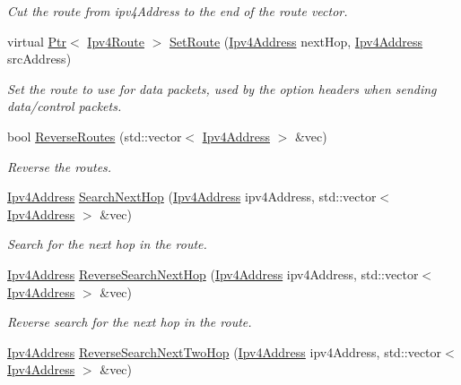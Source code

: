\begin{DoxyCompactItemize}
\begin{DoxyCompactList}\small\item\em Cut the route from ipv4\+Address to the end of the route vector. \end{DoxyCompactList}\item 
virtual \hyperlink{classns3_1_1Ptr}{Ptr}$<$ \hyperlink{classns3_1_1Ipv4Route}{Ipv4\+Route} $>$ \hyperlink{classns3_1_1dsr_1_1DsrOptions_af749b76db4626ae64bc37001a5353b99}{Set\+Route} (\hyperlink{classns3_1_1Ipv4Address}{Ipv4\+Address} next\+Hop, \hyperlink{classns3_1_1Ipv4Address}{Ipv4\+Address} src\+Address)
\begin{DoxyCompactList}\small\item\em Set the route to use for data packets, used by the option headers when sending data/control packets. \end{DoxyCompactList}\item 
bool \hyperlink{classns3_1_1dsr_1_1DsrOptions_a49547f030b51a51499c36f9b5802ec3c}{Reverse\+Routes} (std\+::vector$<$ \hyperlink{classns3_1_1Ipv4Address}{Ipv4\+Address} $>$ \&vec)
\begin{DoxyCompactList}\small\item\em Reverse the routes. \end{DoxyCompactList}\item 
\hyperlink{classns3_1_1Ipv4Address}{Ipv4\+Address} \hyperlink{classns3_1_1dsr_1_1DsrOptions_a061c66ba810a71ae227371a45cc30cc0}{Search\+Next\+Hop} (\hyperlink{classns3_1_1Ipv4Address}{Ipv4\+Address} ipv4\+Address, std\+::vector$<$ \hyperlink{classns3_1_1Ipv4Address}{Ipv4\+Address} $>$ \&vec)
\begin{DoxyCompactList}\small\item\em Search for the next hop in the route. \end{DoxyCompactList}\item 
\hyperlink{classns3_1_1Ipv4Address}{Ipv4\+Address} \hyperlink{classns3_1_1dsr_1_1DsrOptions_a9cc1c0bdf1b57f8b2eea4d9070b26a58}{Reverse\+Search\+Next\+Hop} (\hyperlink{classns3_1_1Ipv4Address}{Ipv4\+Address} ipv4\+Address, std\+::vector$<$ \hyperlink{classns3_1_1Ipv4Address}{Ipv4\+Address} $>$ \&vec)
\begin{DoxyCompactList}\small\item\em Reverse search for the next hop in the route. \end{DoxyCompactList}\item 
\hyperlink{classns3_1_1Ipv4Address}{Ipv4\+Address} \hyperlink{classns3_1_1dsr_1_1DsrOptions_a0f07a079969e9236330167f5e3b95f38}{Reverse\+Search\+Next\+Two\+Hop} (\hyperlink{classns3_1_1Ipv4Address}{Ipv4\+Address} ipv4\+Address, std\+::vector$<$ \hyperlink{classns3_1_1Ipv4Address}{Ipv4\+Address} $>$ \&vec)

\end{DoxyCompactItemize}
